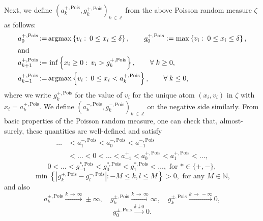 \documentclass[AHL,Unicode,longabstracts,published]{cedram}
\newcommand{\N}{\mathbb N}
\newcommand{\Z}{\mathbb Z}
\newcommand{\argmax}{\mathrm{argmax}}
\newcommand{\Pois}{\text{Pois}}
\let\oldforall\forall
\renewcommand*{\forall}{\mathrel{\oldforall}}
\begin{document}
Next, we define $(a_k^{+,\Pois},g_k^{+,\Pois})_{k\,\in\,\Z}$ from the above Poisson random measure $\zeta$ as follows:
\begin{align*}
a_0^{+,\Pois}\,&{:=}\,\argmax\left\{v_i:\:0\leq x_i\leq \delta\right\},\qquad g_0^{+,\Pois}:=\max\left\{v_i:\:0\leq x_i\leq \delta\right\},
\\
\intertext{and}
a_{k+1}^{+,\Pois}\,&{:=}\,\inf\left\{x_i\geq 0:\:v_i>g_{k}^{+,\Pois}\right\},\qquad \forall k\geq 0,
\\
a_{k-1}^{+,\Pois}\,&{:=}\,\argmax\left\{v_i:\:0\leq x_i<a_{k}^{+,\Pois}\right\},\qquad \forall k\leq 0,
\end{align*}
where we write $g_k^{+,\Pois}$ for the value of $v_i$ for the unique atom $(x_i,v_i)$ in $\zeta$ with $x_i=a_k^{+,\Pois}$. We define $(a_k^{-,\Pois},g_k^{-,\Pois})_{k\,\in\,\Z}$ on the negative side similarly. From basic properties of the Poisson random measure, one can check that, almost-surely, these quantities are well-defined and satisfy
\begin{equation}\label{aok}
\begin{split}
\dots&<a_1^{-,\Pois}<a_0^{-,\Pois}<a_{-1}^{-,\Pois}\\
&<\dots<0<\dots<a_{-1}^+<a_0^{+,\Pois}<a_1^{+,\Pois}<\dots,
\end{split}
\end{equation}
\begin{equation}\label{gok}
0<\dots<g_{-1}^{*,\Pois}<g_0^{*,\Pois}<g_1^{*,\Pois}<\dots, \text{ for }*\in\{+,-\},
\end{equation}
\begin{equation}\label{gsep}
\min\left\{\left|g_k^{+,\Pois}-g_l^{-,\Pois}\right|\colon -M\le k, l \le M\right\}>0, \text{ for any }M\in\N,
\end{equation}
and also
\begin{equation}\label{adiv}
a_k^{\pm,\Pois}\xrightarrow{k\,\rightarrow\,\infty} \pm \infty, \quad g_k^{\pm,\Pois}\xrightarrow{k\,\rightarrow\,\infty} \infty,\quad g_k^{\pm,\Pois}\xrightarrow{k\,\rightarrow\,-\infty}0,
\end{equation}
\begin{equation}\label{gto0}
g_0^{\pm,\Pois}\xrightarrow{\delta\downarrow 0} 0.
\end{equation}
\end{document}

